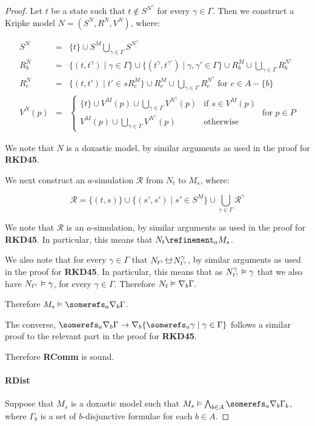 \begin{proof}
Let $t$ be a state such that $t \notin S^{N^\gamma}$ for every $\gamma \in
\Gamma$. Then we construct a Kripke model $N = (S^N, R^N, V^N)$, where:

\begin{eqnarray*}
S^N &=& \{t\} \cup S^M \bigcup_{\gamma \in \Gamma} S^{N^\gamma}\\
R^N_b &=& \{(t, t^\gamma) \mid \gamma \in \Gamma\} \cup \{(t^\gamma,
t^{\gamma'}) \mid \gamma, \gamma' \in \Gamma\} \cup R^M_b \cup \bigcup_{\gamma
\in \Gamma} R^{N^\gamma}_b\\
R^N_c &=& \{(t, t') \mid t' \in sR^M_c\} \cup R^M_c \cup \bigcup_{\gamma \in
\Gamma} R^{N^\gamma}_c \text{ for $c \in A - \{b\}$}\\
V^N(p) &=& 
\begin{cases}
\{t\} \cup V^M(p) \cup \bigcup_{\gamma \in \Gamma} V^{N^\gamma}(p) & \text{if $s
\in V^M(p)$}\\
V^M(p) \cup \bigcup_{\gamma \in \Gamma} V^{N^\gamma}(p) & \text{otherwise}
\end{cases}
\text{ for $p \in P$}
\end{eqnarray*}

We note that $N$ is a doxastic model, by similar arguments as used in the proof
for {\bf RKD45}.

We next construct an $a$-simulation $\mathcal{R}$ from $N_t$ to $M_s$, where:

$$\mathcal{R} = \{(t, s)\} \cup \{(s', s') \mid s' \in S^M\} \cup \bigcup_{\gamma \in \Gamma} \mathcal{R}^\gamma$$

We note that $\mathcal{R}$ is an $a$-simulation, by similar arguments as used in
the proof for {\bf RKD45}. In particular, this means that $N_t \refinement_a
M_s$.

We also note that for every $\gamma \in \Gamma$ that $N_{t^\gamma} \bisim
N^\gamma_{t^\gamma}$, by similar arguments as used in the proof for {\bf RKD45}.
In particular, this means that as $N^\gamma_{t^\gamma} \vDash \gamma$ that we
also have $N_{t^\gamma} \vDash \gamma$, for every $\gamma \in \Gamma$.
Therefore $N_t \vDash \nabla_b \Gamma$.

Therefore $M_s \entails \somerefs_a \covers_b \Gamma$.

The converse, $\somerefs_a \covers_b \Gamma \implies \covers_b \{\somerefs_a
\gamma \mid \gamma \in \Gamma\}$ follows a similar proof to the relevant part in
the proof for {\bf RKD45}.

Therefore {\bf RComm} is sound.

\paragraph{RDist} 
Suppose that $M_s$ is a doxastic model such that $M_s
\entails \bigwedge_{b \in A} \somerefs_a \covers_b \Gamma_b$, where $\Gamma_b$
is a set of $b$-disjunctive formulae for each $b \in A$.


\end{proof}
